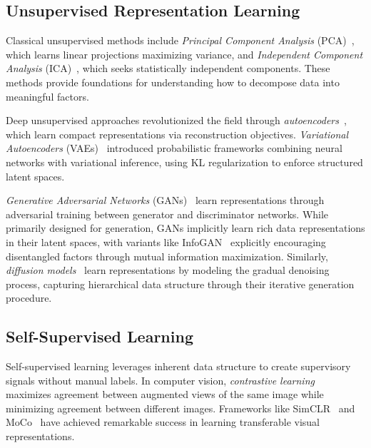 \documentclass[11pt, oneside]{book}
\theoremstyle{plain}
\theoremstyle{definition}
\theoremstyle{remark}
\begin{document}
\subsection{Unsupervised Representation Learning}

Classical unsupervised methods include \emph{Principal Component Analysis} (PCA)~\citep{pearson1901liii}, which learns linear projections maximizing variance, and \emph{Independent Component Analysis} (ICA)~\citep{hyvarinen2000independent}, which seeks statistically independent components. These methods provide foundations for understanding how to decompose data into meaningful factors.

Deep unsupervised approaches revolutionized the field through \emph{autoencoders}~\citep{hinton2006reducing}, which learn compact representations via reconstruction objectives. \emph{Variational Autoencoders} (VAEs)~\citep{kingma2014auto,rezende2014stochastic} introduced probabilistic frameworks combining neural networks with variational inference, using KL regularization to enforce structured latent spaces.

\emph{Generative Adversarial Networks} (GANs)~\citep{goodfellow2014generative} learn representations through adversarial training between generator and discriminator networks. While primarily designed for generation, GANs implicitly learn rich data representations in their latent spaces, with variants like InfoGAN~\citep{chen2016infogan} explicitly encouraging disentangled factors through mutual information maximization. Similarly, \emph{diffusion models}~\citep{ho2020denoising,song2020score} learn representations by modeling the gradual denoising process, capturing hierarchical data structure through their iterative generation procedure.

\subsection{Self-Supervised Learning}

Self-supervised learning leverages inherent data structure to create supervisory signals without manual labels. In computer vision, \emph{contrastive learning}~\citep{chen2020simple,he2020momentum} maximizes agreement between augmented views of the same image while minimizing agreement between different images. Frameworks like SimCLR~\citep{chen2020simple} and MoCo~\citep{he2020momentum} have achieved remarkable success in learning transferable visual representations.
\end{document}
